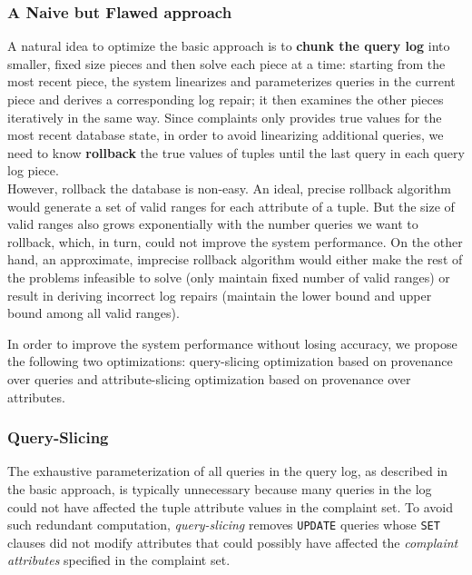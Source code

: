 \subsubsection{A Naive but Flawed approach}
A natural idea to optimize the basic approach is 
to \textbf{chunk the query log} into
smaller, fixed size pieces and then solve each piece at a time: starting
from the most recent piece, the system linearizes and parameterizes queries 
in the current piece and derives a corresponding log repair; 
it then examines the other pieces iteratively
in the same way. Since complaints only provides
true values for the most recent database state, in order to avoid 
linearizing additional queries, 
we need to know \textbf{rollback} the true values of tuples 
until the last query in each query log piece. \\
However, rollback the database is non-easy. An ideal, precise rollback
algorithm would generate a set of valid ranges for each attribute of a tuple. 
But the size of valid ranges also grows exponentially with the number queries
we want to rollback, which, in turn, could not improve the system performance. 
On the other hand, an approximate, imprecise 
rollback algorithm would either make the rest of the problems
infeasible to solve (only maintain fixed number of valid ranges) 
or result in deriving 
incorrect log repairs (maintain the lower 
bound and upper bound among all valid ranges).
  

In order to improve the system performance without losing accuracy, we propose
the following two optimizations: query-slicing optimization 
based on provenance over queries and
attribute-slicing optimization based on provenance over 
attributes. 

\subsubsection{Query-Slicing}
\label{sec:opt:query}
The exhaustive parameterization of all queries in the query log, as described
in the basic approach, is typically unnecessary because many queries in the log
could not have affected the tuple attribute values in the complaint set.
To avoid such redundant computation, \textit{query-slicing} 
removes \texttt{UPDATE} queries whose \texttt{SET} clauses did not modify 
attributes that could possibly have affected the {\it complaint attributes} 
specified in the complaint set.

